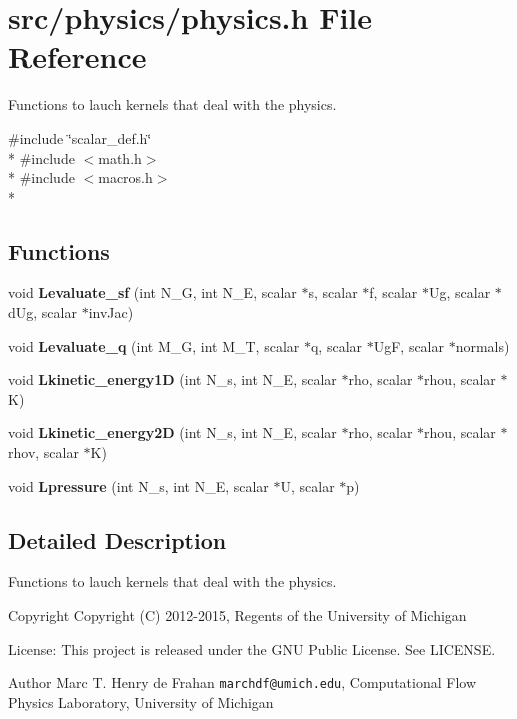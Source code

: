 \section{src/physics/physics.h File Reference}
\label{physics_8h}


Functions to lauch kernels that deal with the physics.  


{\ttfamily \#include \char`\"{}scalar\-\_\-def.\-h\char`\"{}}\\*
{\ttfamily \#include $<$math.\-h$>$}\\*
{\ttfamily \#include $<$macros.\-h$>$}\\*
\subsection*{Functions}
\begin{DoxyCompactItemize}
\item 
void {\bf Levaluate\-\_\-sf} (int N\-\_\-\-G, int N\-\_\-\-E, scalar $\ast$s, scalar $\ast$f, scalar $\ast$Ug, scalar $\ast$d\-Ug, scalar $\ast$inv\-Jac)
\item 
void {\bf Levaluate\-\_\-q} (int M\-\_\-\-G, int M\-\_\-\-T, scalar $\ast$q, scalar $\ast$Ug\-F, scalar $\ast$normals)
\item 
void {\bf Lkinetic\-\_\-energy1\-D} (int N\-\_\-s, int N\-\_\-\-E, scalar $\ast$rho, scalar $\ast$rhou, scalar $\ast$K)
\item 
void {\bf Lkinetic\-\_\-energy2\-D} (int N\-\_\-s, int N\-\_\-\-E, scalar $\ast$rho, scalar $\ast$rhou, scalar $\ast$rhov, scalar $\ast$K)
\item 
void {\bf Lpressure} (int N\-\_\-s, int N\-\_\-\-E, scalar $\ast$U, scalar $\ast$p)
\end{DoxyCompactItemize}


\subsection{Detailed Description}
Functions to lauch kernels that deal with the physics. \begin{DoxyCopyright}{Copyright}
Copyright (C) 2012-\/2015, Regents of the University of Michigan 
\end{DoxyCopyright}
\begin{DoxyParagraph}{License\-:}
This project is released under the G\-N\-U Public License. See L\-I\-C\-E\-N\-S\-E. 
\end{DoxyParagraph}
\begin{DoxyAuthor}{Author}
Marc T. Henry de Frahan {\tt marchdf@umich.\-edu}, Computational Flow Physics Laboratory, University of Michigan 
\end{DoxyAuthor}



